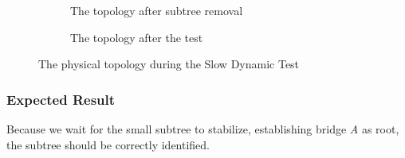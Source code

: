 \begin{figure}[hp]
\begin{center}
\begin{subfigure}[b]{0.4\textwidth}
            \caption{The topology after subtree removal}
            \label{fig:sdcTest3}
        \end{subfigure}
        \hspace{1cm}
        \begin{subfigure}[b]{0.4\textwidth}
            \caption{The topology after the test}
            \label{fig:sdcTest5}
       \end{subfigure}
    \end{center}
    \caption{The physical topology during the Slow Dynamic Test}
\end{figure}

\subsubsection*{Expected Result}
Because we wait for the small subtree to stabilize, establishing bridge \textit{A} as root, the subtree should be correctly identified.

